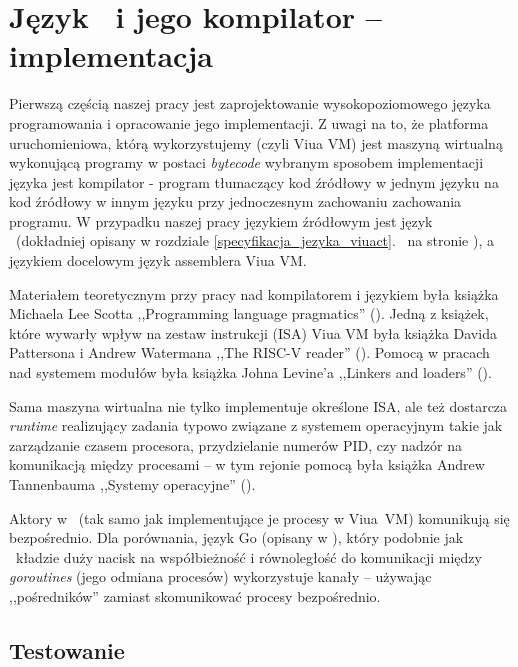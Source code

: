 \chapter{Język \ViuAct\ i jego kompilator -- implementacja}
\label{viuact_impl}
\label{jezyk_viuact_i_jego_kompilator}

Pierwszą częścią naszej pracy jest zaprojektowanie wysokopoziomowego języka
programowania i opracowanie jego implementacji. Z uwagi na to, że platforma
uruchomieniowa, którą wykorzystujemy (czyli Viua VM) jest maszyną wirtualną
wykonującą programy w postaci \emph{bytecode} wybranym sposobem implementacji
języka jest kompilator - program tłumaczący kod źródłowy w jednym języku na kod
źródłowy w innym języku przy jednoczesnym zachowaniu zachowania programu.
W przypadku naszej pracy językiem źródłowym jest język \ViuAct\ (dokładniej
opisany w rozdziale \ref{specyfikacja_jezyka_viuact}.~
na stronie \pageref{specyfikacja_jezyka_viuact}), a językiem docelowym język
assemblera Viua VM.

Materiałem teoretycznym przy pracy nad kompilatorem i językiem była książka
Michaela Lee Scotta ,,Programming language pragmatics'' (\cite{ProgrammingLanguagePragmatics}).
Jedną z książek, które wywarły wpływ na zestaw instrukcji (ISA) Viua VM była
książka Davida Pattersona i Andrew Watermana ,,The RISC-V reader'' (\cite{RISCV}).
Pomocą w pracach nad systemem modułów była książka Johna Levine'a ,,Linkers and
loaders'' (\cite{Linkers}).

Sama maszyna wirtualna nie tylko implementuje określone ISA, ale też dostarcza
\emph{runtime} realizujący zadania typowo związane z systemem operacyjnym takie
jak zarządzanie czasem procesora, przydzielanie numerów PID, czy nadzór na
komunikacją między procesami -- w tym rejonie pomocą była książka Andrew
Tannenbauma ,,Systemy operacyjne'' (\cite{OperatingSystems}).

Aktory w \ViuAct\ (tak samo jak implementujące je procesy w Viua~VM) komunikują
się bezpośrednio. Dla porównania, język Go (opisany w \cite{Golang}), który
podobnie jak \ViuAct\ kładzie duży nacisk na współbieżność i równoległość do
komunikacji między \emph{goroutines} (jego odmiana procesów) wykorzystuje kanały
-- używając ,,pośredników'' zamiast skomunikować procesy bezpośrednio.





\section{Testowanie}


